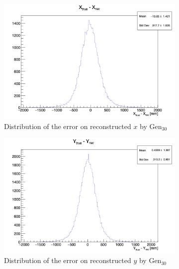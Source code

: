 \documentclass[../main.tex]{subfiles}
\begin{document}
{{\begin{figure}[ht]
  \centering
  \begin{subfigure}[t]{0.32\linewidth}
    \centering
    \includegraphics[width=\linewidth]{images/jcnn/vic_cnn/cnn_delta_x.png}
    \caption{Distribution of the error on reconstructed $x$ by $\mathrm{Gen}_{30}$}
    \label{fig:jcnn:vic_cnn:cnn_delta_x}
  \end{subfigure}
  \begin{subfigure}[t]{0.32\linewidth}
    \centering
    \includegraphics[width=\linewidth]{images/jcnn/vic_cnn/cnn_delta_y.png}
    \caption{Distribution of the error on reconstructed $y$ by $\mathrm{Gen}_{30}$}
    \label{fig:jcnn:vic_cnn:cnn_delta_y}
  \end{subfigure}
  \begin{subfigure}[t]{0.32\linewidth}
    \centering

\end{subfigure}
\end{figure}}}
\end{document}
